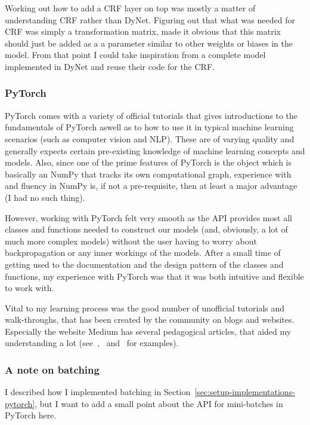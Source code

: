 Working out how to add a CRF layer on top was mostly a matter of understanding
CRF rather than DyNet. Figuring out that what was needed for CRF was simply a
transformation matrix, made it obvious that this matrix should just be added as
a a parameter similar to other weights or biases in the model. From that point I
could take inspiration from a complete model implemented in DyNet and reuse
their code for the CRF.\

\subsubsection{PyTorch}

PyTorch comes with a variety of official tutorials that gives introductions to
the fundamentals of PyTorch aswell as to how to use it in typical machine
learning scenarios (such as computer vision and NLP). These are of varying
quality and generally expects certain pre-existing knowledge of machine learning
concepts and models. Also, since one of the prime features of PyTorch is the
 object which is basically an NumPy  that tracks its
own computational graph, experience with and fluency in NumPy is, if not a
pre-requisite, then at least a major advantage (I had no such thing).

However, working with PyTorch felt very smooth as the API provides most all
classes and functions needed to construct our models (and, obviously, a lot of
much more complex models) without the user having to worry about backpropagation
or any inner workings of the models. After a small time of getting used to the
documentation and the design pattern of the classes and functions, my experience
with PyTorch was that it was both intuitive and flexible to work with.

Vital to my learning process was the good number of unofficial tutorials and
walk-throughs, that has been created by the community on blogs and websites.
Especially the website Medium has several pedagogical articles, that aided my
understanding a lot (see~\cite{falcon2018lstms},~\cite{boulton2018conditional}
and~\cite{treviso2019crf} for examples).

\subsubsection*{A note on batching}

I described how I implemented batching in
Section~\ref{sec:setup-implementations-pytorch}, but I want to add a small point
about the API for mini-batches in PyTorch here.

